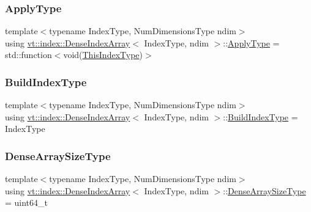 \subsubsection{\texorpdfstring{Apply\+Type}{ApplyType}}
{\footnotesize\ttfamily template$<$typename Index\+Type, Num\+Dimensions\+Type ndim$>$ \\
using \hyperlink{structvt_1_1index_1_1_dense_index_array}{vt\+::index\+::\+Dense\+Index\+Array}$<$ Index\+Type, ndim $>$\+::\hyperlink{structvt_1_1index_1_1_dense_index_array_ab44b9e5a65d28520268523fbe99f6a9d}{Apply\+Type} =  std\+::function$<$void(\hyperlink{structvt_1_1index_1_1_dense_index_array_a6915511f6a82dff2522d6e8c2be20f2a}{This\+Index\+Type})$>$}

\mbox{\label{structvt_1_1index_1_1_dense_index_array_a84d2aa360d257c9b1d7e324088c7763b}} 
\subsubsection{\texorpdfstring{Build\+Index\+Type}{BuildIndexType}}
{\footnotesize\ttfamily template$<$typename Index\+Type, Num\+Dimensions\+Type ndim$>$ \\
using \hyperlink{structvt_1_1index_1_1_dense_index_array}{vt\+::index\+::\+Dense\+Index\+Array}$<$ Index\+Type, ndim $>$\+::\hyperlink{structvt_1_1index_1_1_dense_index_array_a84d2aa360d257c9b1d7e324088c7763b}{Build\+Index\+Type} =  Index\+Type}

\mbox{\label{structvt_1_1index_1_1_dense_index_array_a7a66b5cd270377310119da3d0c884224}} 
\subsubsection{\texorpdfstring{Dense\+Array\+Size\+Type}{DenseArraySizeType}}
{\footnotesize\ttfamily template$<$typename Index\+Type, Num\+Dimensions\+Type ndim$>$ \\
using \hyperlink{structvt_1_1index_1_1_dense_index_array}{vt\+::index\+::\+Dense\+Index\+Array}$<$ Index\+Type, ndim $>$\+::\hyperlink{structvt_1_1index_1_1_dense_index_array_a7a66b5cd270377310119da3d0c884224}{Dense\+Array\+Size\+Type} =  uint64\+\_\+t}

